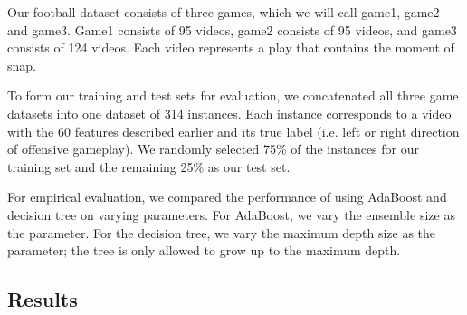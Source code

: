 \documentclass{article} %
\begin{document}
Our football dataset consists of three games, which we will call game1, game2 and game3. Game1 consists of 95 videos, game2 consists of 95 videos, and game3 consists of 124 videos. Each video represents a play that contains the moment of snap.

To form our training and test sets for evaluation, we concatenated all three game datasets into one dataset of 314 instances. Each instance corresponds to a video with the 60 features described earlier and its true label (i.e. left or right direction of offensive gameplay). We randomly selected 75\% of the instances for our training set and the remaining 25\% as our test set.

For empirical evaluation, we compared the performance of using AdaBoost and decision tree on varying parameters. For AdaBoost, we vary the ensemble size as the parameter. For the decision tree, we vary the maximum depth size as the parameter; the tree is only allowed to grow up to the maximum depth.

\subsection{Results}
\end{document}
